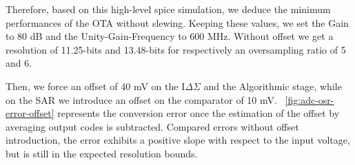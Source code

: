 Therefore, based on this high-level spice simulation, we deduce the minimum performances of the OTA without slewing. Keeping these values, we set the Gain to 80 dB and the Unity-Gain-Frequency to 600 MHz. Without offset we get a resolution of 11.25-bits and 13.48-bits for respectively an oversampling ratio of 5 and 6.

Then, we force an offset of 40 mV on the I\(\Delta\Sigma\) and the Algorithmic stage, while on the SAR we introduce an offset on the comparator of 10 mV. \figurename~\ref{fig:adc-osr-error-offset} represents the conversion error once the estimation of the offset by averaging output codes is subtracted. Compared errors without offset introduction, the error exhibits a positive slope with respect to the input voltage, but is still in the expected resolution bounds.

